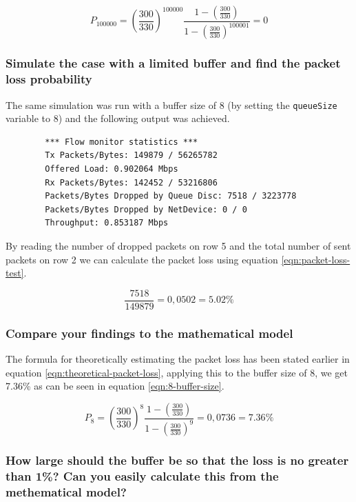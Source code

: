 \documentclass{article}
\begin{document}
    \begin{equation}
    \label{eqn:100k-buffer-size}
        P_{100000} = \left(\frac{300}{330}\right)^{100000}\frac{1-(\frac{300}{330})}{1-(\frac{300}{330})^{100001}} = 0 
    \end{equation}

    \subsubsection*{Simulate the case with a limited buffer and find the packet loss probability}
    The same simulation was run with a buffer size of 8 (by setting the \verb|queueSize| variable to 8) and the following output was achieved.

    \begin{lstlisting}
        *** Flow monitor statistics ***
        Tx Packets/Bytes: 149879 / 56265782
        Offered Load: 0.902064 Mbps
        Rx Packets/Bytes: 142452 / 53216806
        Packets/Bytes Dropped by Queue Disc: 7518 / 3223778
        Packets/Bytes Dropped by NetDevice: 0 / 0
        Throughput: 0.853187 Mbps
    \end{lstlisting}

    By reading the number of dropped packets on row 5 and the total number of sent packets on row 2 we can calculate the packet loss using equation \ref{eqn:packet-loss-test}.

    \begin{equation}
    \label{eqn:packet-loss-test}
        \frac{7518}{149879} = 0,0502 = 5.02\% 
    \end{equation}

    \subsubsection*{Compare your findings to the mathematical model}

    The formula for theoretically estimating the packet loss has been stated earlier in equation \ref{eqn:theoretical-packet-loss}, applying this to the buffer size of 8, we get 7.36\% as can be seen in equation \ref{eqn:8-buffer-size}.

    \begin{equation}
    \label{eqn:8-buffer-size}
        P_{8} = \left(\frac{300}{330}\right)^{8}\frac{1-(\frac{300}{330})}{1-(\frac{300}{330})^{9}} = 0,0736 = 7.36\%
    \end{equation}

    \subsubsection*{How large should the buffer be so that the loss is no greater than 1\%? Can you easily calculate this from the methematical model?}
\end{document}
